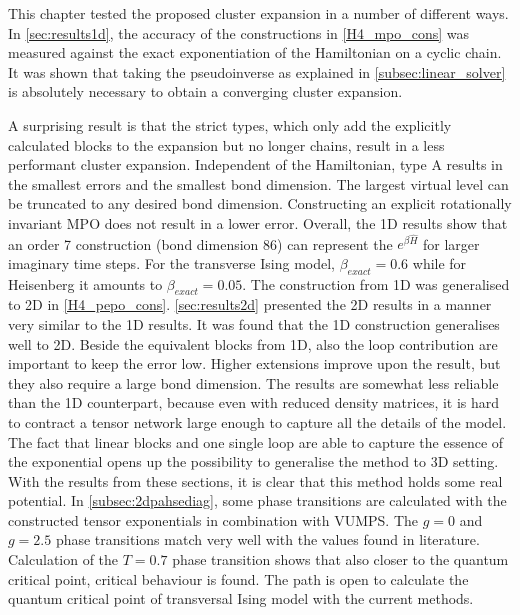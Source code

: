 This chapter tested the proposed cluster expansion in a number of different ways. In \cref{sec:results1d}, the accuracy of the constructions in \cref{H4_mpo_cons} was measured against the exact exponentiation of the Hamiltonian on a cyclic chain. It was shown that taking the pseudoinverse as explained in \cref{subsec:linear_solver} is absolutely necessary to obtain a converging cluster expansion.

A surprising result is that the strict types, which only add the explicitly calculated blocks to the expansion but no longer chains, result in a less performant cluster expansion. Independent of the Hamiltonian, type A results in the smallest errors and the smallest bond dimension. The largest virtual level can be truncated to any desired bond dimension. Constructing an explicit rotationally invariant MPO does not result in a lower error.
Overall, the 1D results show that an order 7 construction (bond dimension 86) can represent the $e^{\beta \hat{H}}$ for larger imaginary time steps. For the transverse Ising model, $\beta_{exact} = 0.6$ while for Heisenberg it amounts to $\beta_{exact} = 0.05$.
The construction from 1D was generalised to 2D in \cref{H4_pepo_cons}. \cref{sec:results2d} presented the 2D results in a manner very similar to the 1D results. It was found that the 1D construction generalises well to 2D. Beside the equivalent blocks from 1D, also the loop contribution are important to keep the error low. Higher extensions improve upon the result, but they also require a large bond dimension. The results are somewhat less reliable than the 1D counterpart, because even with reduced density matrices, it is hard to contract a tensor network large enough to capture all the details of the model.
The fact that linear blocks and one single loop are able to capture the essence of the exponential opens up the possibility to generalise the method to 3D setting.
With the results from these sections, it is clear that this method holds some real potential. In \cref{subsec:2dpahsediag}, some phase transitions are calculated with the constructed tensor exponentials in combination with VUMPS. The $g=0$ and $g=2.5$ phase transitions match very well with the values found in literature. Calculation of the $T=0.7$ phase transition shows that also closer to the quantum critical point, critical behaviour is found.
The path is open to calculate the quantum critical point of transversal Ising model with the current methods.